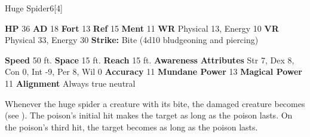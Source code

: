   \begin{monsubsection}{Huge Spider}{6}[4]
    \vspace{-1em}\vspace{-1em}
    \vspace{0em}

    
    

    \begin{spellcontent}
      \begin{spelltargetinginfo}
        \pari \textbf{HP} 36 \monsep
          \textbf{AD} 18 \monsep
          \textbf{Fort} 13 \monsep
          \textbf{Ref} 15 \monsep
          \textbf{Ment} 11
        \pari \textbf{WR} Physical 13, Energy 10 \monsep
        \textbf{VR} Physical 33, Energy 30
        \pari \textbf{Strike:}
            Bite  (4d10 bludgeoning and piercing)
      \end{spelltargetinginfo}
    \end{spellcontent}
    \begin{monsterfooter}
      \pari \textbf{Speed} 50 ft. \monsep
        \textbf{Space} 15 ft. \monsep
        \textbf{Reach} 15 ft.
      \pari \textbf{Awareness} 
      \pari \textbf{Attributes}
        Str 7, Dex 8,
        Con 0, Int -9,
        Per 8, Wil 0
      \pari \textbf{Accuracy} 11 \monsep
        \textbf{Mundane Power} 13 \monsep
      \textbf{Magical Power} 11
      \pari \textbf{Alignment} Always true neutral
    \end{monsterfooter}
  \end{monsubsection}
        Whenever the huge spider  a creature with its bite,
          the damaged creature becomes  (see ).
        The poison's initial hit makes the target  as long as the poison lasts.
        On the poison's third hit, the target becomes  as long as the poison lasts.
  

